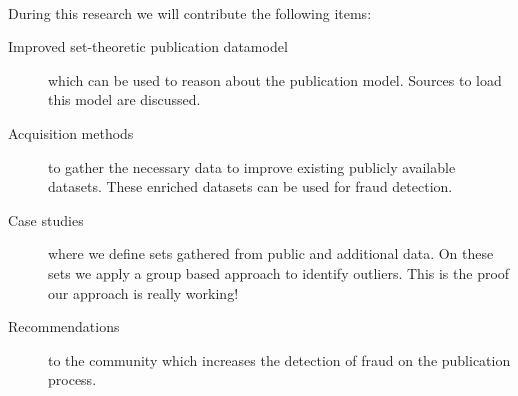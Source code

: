 \documentclass{ou-report}
\newcommand{\outline}[1]{{\color{blue} #1}}
\newcommand{\old}[1]{{\color{gray} #1}}
\begin{document}
\paragraph{}
During this research we will contribute the following items:
\begin{description}
    \item[Improved set-theoretic publication datamodel] which can be used to 
        reason about the publication model. Sources to load this model are 
        discussed.
    \item[Acquisition methods] to gather the necessary data to improve existing 
        publicly available datasets. These enriched datasets can be used for
        fraud detection.
    \item[Case studies] where we define sets gathered from public and additional
        data. On these sets we apply a group based approach to identify 
        outliers. This is the proof our approach is really working!
    \item[Recommendations] to the community which increases the detection of 
        fraud on the publication process. 
\end{description}
\end{document}
